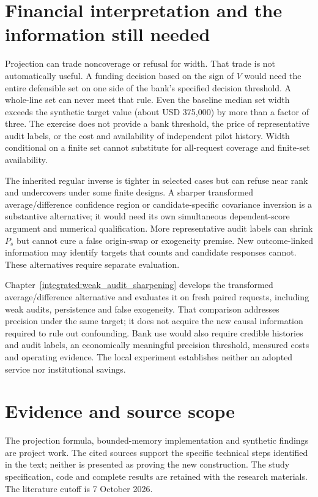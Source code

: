 \section{Financial interpretation and the information still needed}

Projection can trade noncoverage or refusal for width. That trade is not
automatically useful. A funding decision based on the sign of $V$ would need
the entire defensible set on one side of the bank's specified decision
threshold. A whole-line set can never meet that rule. Even the baseline median
set width exceeds the synthetic target value (about USD 375,000) by more than
a factor of three. The exercise does not provide a bank threshold, the price
of representative audit labels, or the cost and availability of independent
pilot history. Width conditional on a finite set cannot substitute for
all-request coverage and finite-set availability.

The inherited regular inverse is tighter in selected cases but can refuse
near rank and undercovers under some finite designs. A sharper transformed
average/difference confidence region or candidate-specific covariance
inversion is a substantive alternative; it would need its own simultaneous
dependent-score argument and numerical qualification. More representative
audit labels can shrink $P_s$ but cannot cure a false origin-swap or
exogeneity premise. New outcome-linked information may identify targets that
counts and candidate responses cannot. These alternatives require separate evaluation.

Chapter~\ref{integrated:weak_audit_sharpening} develops the transformed average/difference alternative and evaluates it on fresh paired requests, including weak audits, persistence and false exogeneity. That comparison addresses precision under the same target; it does not acquire the new causal information required to rule out confounding. Bank use would also require
credible histories and audit labels, an economically meaningful precision
threshold, measured costs and operating evidence. The local experiment
establishes neither an adopted service nor institutional savings.

\section*{Evidence and source scope}

The projection formula, bounded-memory implementation and synthetic
findings are project work. The cited sources support the specific technical
steps identified in the text; neither is presented as proving the new
construction. The study specification, code and complete results are retained
with the research materials. The literature cutoff is 7 October 2026.
